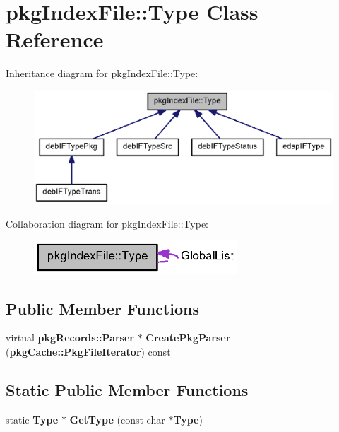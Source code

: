 \section{pkg\-Index\-File\-:\-:\-Type \-Class \-Reference}
\label{classpkgIndexFile_1_1Type}


\-Inheritance diagram for pkg\-Index\-File\-:\-:\-Type\-:
\nopagebreak
\begin{figure}[H]
\begin{center}
\leavevmode
\includegraphics[width=350pt]{classpkgIndexFile_1_1Type__inherit__graph}
\end{center}
\end{figure}


\-Collaboration diagram for pkg\-Index\-File\-:\-:\-Type\-:
\nopagebreak
\begin{figure}[H]
\begin{center}
\leavevmode
\includegraphics[width=215pt]{classpkgIndexFile_1_1Type__coll__graph}
\end{center}
\end{figure}
\subsection*{\-Public \-Member \-Functions}
\begin{DoxyCompactItemize}
\item 
virtual {\bf pkg\-Records\-::\-Parser} $\ast$ {\bfseries \-Create\-Pkg\-Parser} ({\bf pkg\-Cache\-::\-Pkg\-File\-Iterator}) const \label{classpkgIndexFile_1_1Type_a3026af4446ad1f8c4ec9f98185da292d}

\end{DoxyCompactItemize}
\subsection*{\-Static \-Public \-Member \-Functions}
\begin{DoxyCompactItemize}
\item 
static {\bf \-Type} $\ast$ {\bfseries \-Get\-Type} (const char $\ast${\bf \-Type})\label{classpkgIndexFile_1_1Type_a7261e8b563674e7cd2d317155b23b6f6}

\end{DoxyCompactItemize}

